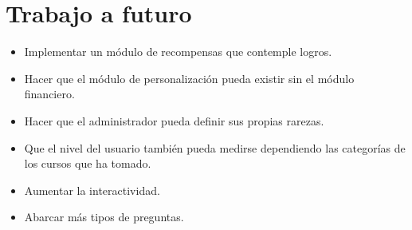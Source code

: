 \chapter{Trabajo a futuro} \label{ch:futuro}

\begin{itemize}
  \item Implementar un módulo de recompensas que contemple logros.
  \item Hacer que el módulo de personalización pueda existir sin el módulo financiero.
  \item Hacer que el administrador pueda definir sus propias rarezas.
  \item Que el nivel del usuario también pueda medirse dependiendo las categorías de los cursos que ha tomado.
  \item Aumentar la interactividad.
  \item Abarcar más tipos de preguntas.
\end{itemize}
